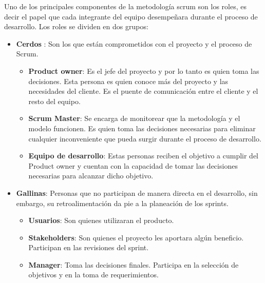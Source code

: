 Uno de los principales componentes de la metodología scrum son los roles, es decir 
el papel que cada integrante del equipo desempeñara durante el proceso de desarrollo.
 Los roles se dividen en dos grupos:
\begin{itemize}
	\item \textbf{Cerdos} : Son los que están comprometidos con el proyecto y el proceso 
	de Scrum.
		\begin{itemize}
			\item \textbf{Product owner}: Es el jefe del proyecto y por lo tanto es 
			quien toma las decisiones. Esta persona es quien conoce más del proyecto y 
			las necesidades del cliente. Es el puente de comunicación entre el 
			cliente y el resto del equipo. 
			\item \textbf{Scrum Master}: Se encarga de monitorear que la metodología y 
			el modelo funcionen. Es quien toma las decisiones necesarias para 
			eliminar cualquier inconveniente que pueda surgir durante el proceso 
			de desarrollo. 
			\item \textbf{Equipo de desarrollo}: Estas personas reciben el objetivo a 
			cumplir del Product owner y cuentan con la capacidad de tomar las decisiones 
			necesarias para alcanzar dicho objetivo.
		\end{itemize}
	\item \textbf{Gallinas}: Personas que no participan de manera directa en el 
	desarrollo, sin embargo, su retroalimentación da pie a la planeación de los sprints.
		\begin{itemize}
			\item \textbf{Usuarios}: Son quienes utilizaran el producto.
			\item \textbf{Stakeholders}: Son quienes el proyecto les aportara algún 
			beneficio. Participan en las revisiones del sprint.
			\item \textbf{Manager}: Toma las decisiones finales. Participa en la 
			selección de objetivos y en la toma de requerimientos\cite{Ref_ScrumRef}.
		\end{itemize}
\end{itemize}

